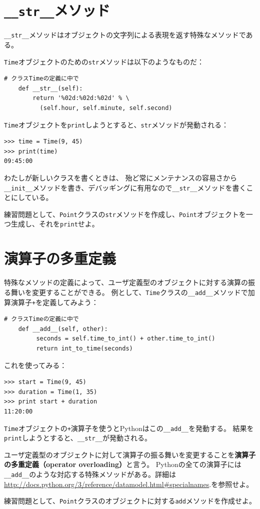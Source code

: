 \documentclass[a4j,12pt,makeidx]{jbook}
\begin{document}
\section{{\tt \_\_str\_\_}メソッド}
{\verb"__str__"}メソッドはオブジェクトの文字列による表現を返す特殊なメソッドである。\par
{\tt Time}オブジェクトのための{\tt str}メソッドは以下のようなものだ：
\begin{verbatim}
# クラスTimeの定義に中で
    def __str__(self):
        return '%02d:%02d:%02d' % \
          (self.hour, self.minute, self.second)
\end{verbatim}
{\tt Time}オブジェクトを{\tt print}しようとすると、{\tt str}メソッドが発動される：
\begin{verbatim}
>>> time = Time(9, 45)
>>> print(time)
09:45:00
\end{verbatim}
わたしが新しいクラスを書くときは、
殆ど常にメンテナンスの容易さから{\verb"__init__"}メソッドを書き、デバッギングに有用なので{\verb"__str__"}メソッドを書くことにしている。\par
練習問題として、{\tt Point}クラスの{\tt str}メソッドを作成し、{\tt Point}オブジェクトを一つ生成し、それを{\tt print}せよ。
%
\section{演算子の多重定義}
特殊なメソッドの定義によって、ユーザ定義型のオブジェクトに対する演算の振る舞いを変更することができる。
例として、{\tt Time}クラスの{\verb"__add__"}メソッドで加算演算子{\tt +}を定義してみよう：
\begin{verbatim}
# クラスTimeの定義に中で
    def __add__(self, other):
         seconds = self.time_to_int() + other.time_to_int()
         return int_to_time(seconds)
\end{verbatim}
これを使ってみる：
\begin{verbatim}
>>> start = Time(9, 45)
>>> duration = Time(1, 35)
>>> print start + duration
11:20:00
\end{verbatim}
{\tt Time}オブジェクトの{\tt +}演算子を使うとPythonはこの{\verb"__add__"}を発動する。
結果を{\tt print}しようとすると、{\verb"__str__"}が発動される。\par
ユーザ定義型のオブジェクトに対して演算子の振る舞いを変更することを{\bf 演算子の多重定義（operator overloading）}と言う。
Pythonの全ての演算子には{\verb"__add__"}のような対応する特殊メソッドがある。詳細は
\url{http://docs.python.org/3/reference/datamodel.html#specialnames}.を参照せよ。\par
練習問題として、{\tt Point}クラスのオブジェクトに対する{\tt add}メソッドを作成せよ。
%
\end{document}
